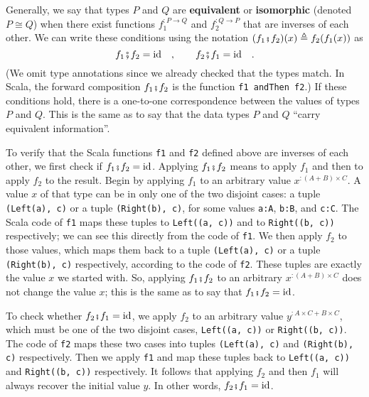 Generally, we say that types $P$ and $Q$ are \textbf{equivalent}
or \textbf{isomorphic} (denoted $P\cong Q$) when
there exist functions $f_{1}^{:P\rightarrow Q}$ and $f_{2}^{:Q\rightarrow P}$
that are inverses of each other. We can write these conditions using
the notation $(f_{1}\bef f_{2})(x)\triangleq f_{2}(f_{1}(x))$ as
\[
f_{1}\bef f_{2}=\text{id}\quad,\quad\quad f_{2}\bef f_{1}=\text{id}\quad.
\]
(We omit type annotations since we already checked that the types
match. In Scala, the forward composition $f_{1}\bef f_{2}$ is the
function \lstinline!f1 andThen f2!.) If these conditions hold, there
is a one-to-one correspondence between the values of types $P$ and
$Q$. This is the same as to say that the data types $P$ and $Q$
``carry equivalent information''.

To verify that the Scala functions \lstinline!f1! and \lstinline!f2!
defined above are inverses of each other, we first check if $f_{1}\bef f_{2}=\text{id}$.
Applying $f_{1}\bef f_{2}$ means to apply $f_{1}$ and then to apply
$f_{2}$ to the result. Begin by applying $f_{1}$ to an arbitrary
value $x^{:(A+B)\times C}$. A value $x$ of that type can be in only
one of the two disjoint cases: a tuple \lstinline!(Left(a), c)! or
a tuple \lstinline!(Right(b), c)!, for some values \lstinline!a:A!,
\lstinline!b:B!, and \lstinline!c:C!. The Scala code of \lstinline!f1!
maps these tuples to \lstinline!Left((a, c))! and to \lstinline!Right((b, c))!
respectively; we can see this directly from the code of \lstinline!f1!.
We then apply $f_{2}$ to those values, which maps them back to a
tuple \lstinline!(Left(a), c)! or a tuple \lstinline!(Right(b), c)!
respectively, according to the code of \lstinline!f2!. These tuples
are exactly the value $x$ we started with. So, applying $f_{1}\bef f_{2}$
to an arbitrary $x^{:(A+B)\times C}$ does not change the value $x$;
this is the same as to say that $f_{1}\bef f_{2}=\text{id}$.

To check whether $f_{2}\bef f_{1}=\text{id}$, we apply $f_{2}$ to
an arbitrary value $y^{:A\times C+B\times C}$, which must be one
of the two disjoint cases, \lstinline!Left((a, c))! or \lstinline!Right((b, c))!.
The code of \lstinline!f2! maps these two cases into tuples \lstinline!(Left(a), c)!
and \lstinline!(Right(b), c)! respectively. Then we apply \lstinline!f1!
and map these tuples back to \lstinline!Left((a, c))! and \lstinline!Right((b, c))!
respectively. It follows that applying $f_{2}$ and then $f_{1}$
will always recover the initial value $y$. In other words, $f_{2}\bef f_{1}=\text{id}$.

